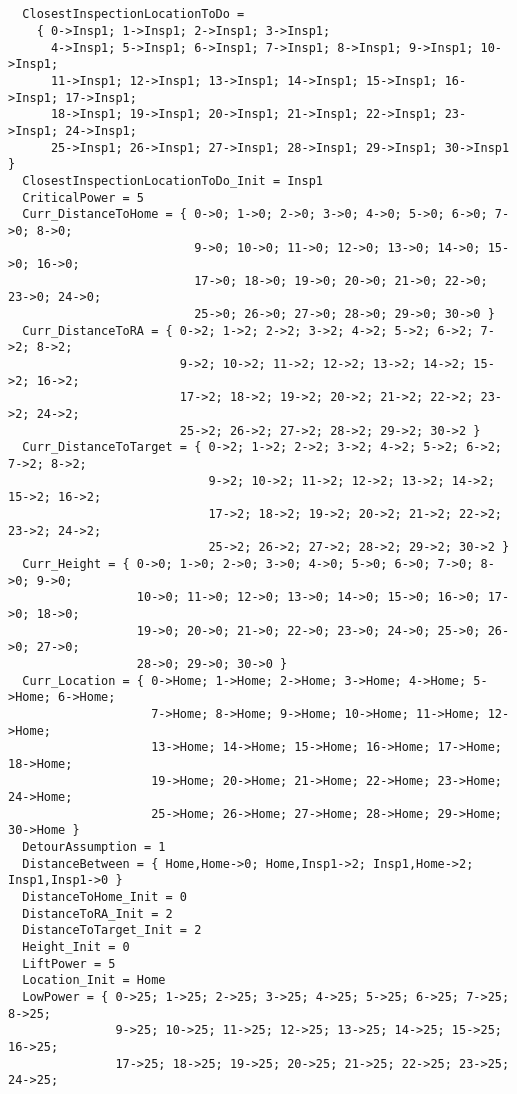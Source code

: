 \documentclass[12pt]{extarticle}
\begin{document}
\begin{lstlisting}[basicstyle=\tiny]
  
  
  ClosestInspectionLocationToDo =
    { 0->Insp1; 1->Insp1; 2->Insp1; 3->Insp1;
      4->Insp1; 5->Insp1; 6->Insp1; 7->Insp1; 8->Insp1; 9->Insp1; 10->Insp1;
      11->Insp1; 12->Insp1; 13->Insp1; 14->Insp1; 15->Insp1; 16->Insp1; 17->Insp1;
      18->Insp1; 19->Insp1; 20->Insp1; 21->Insp1; 22->Insp1; 23->Insp1; 24->Insp1;
      25->Insp1; 26->Insp1; 27->Insp1; 28->Insp1; 29->Insp1; 30->Insp1 }
  ClosestInspectionLocationToDo_Init = Insp1
  CriticalPower = 5
  Curr_DistanceToHome = { 0->0; 1->0; 2->0; 3->0; 4->0; 5->0; 6->0; 7->0; 8->0;
                          9->0; 10->0; 11->0; 12->0; 13->0; 14->0; 15->0; 16->0;
                          17->0; 18->0; 19->0; 20->0; 21->0; 22->0; 23->0; 24->0;
                          25->0; 26->0; 27->0; 28->0; 29->0; 30->0 }
  Curr_DistanceToRA = { 0->2; 1->2; 2->2; 3->2; 4->2; 5->2; 6->2; 7->2; 8->2;
                        9->2; 10->2; 11->2; 12->2; 13->2; 14->2; 15->2; 16->2;
                        17->2; 18->2; 19->2; 20->2; 21->2; 22->2; 23->2; 24->2;
                        25->2; 26->2; 27->2; 28->2; 29->2; 30->2 }
  Curr_DistanceToTarget = { 0->2; 1->2; 2->2; 3->2; 4->2; 5->2; 6->2; 7->2; 8->2;
                            9->2; 10->2; 11->2; 12->2; 13->2; 14->2; 15->2; 16->2;
                            17->2; 18->2; 19->2; 20->2; 21->2; 22->2; 23->2; 24->2;
                            25->2; 26->2; 27->2; 28->2; 29->2; 30->2 }
  Curr_Height = { 0->0; 1->0; 2->0; 3->0; 4->0; 5->0; 6->0; 7->0; 8->0; 9->0;
                  10->0; 11->0; 12->0; 13->0; 14->0; 15->0; 16->0; 17->0; 18->0;
                  19->0; 20->0; 21->0; 22->0; 23->0; 24->0; 25->0; 26->0; 27->0;
                  28->0; 29->0; 30->0 }
  Curr_Location = { 0->Home; 1->Home; 2->Home; 3->Home; 4->Home; 5->Home; 6->Home;
                    7->Home; 8->Home; 9->Home; 10->Home; 11->Home; 12->Home;
                    13->Home; 14->Home; 15->Home; 16->Home; 17->Home; 18->Home;
                    19->Home; 20->Home; 21->Home; 22->Home; 23->Home; 24->Home;
                    25->Home; 26->Home; 27->Home; 28->Home; 29->Home; 30->Home }
  DetourAssumption = 1
  DistanceBetween = { Home,Home->0; Home,Insp1->2; Insp1,Home->2; Insp1,Insp1->0 }
  DistanceToHome_Init = 0
  DistanceToRA_Init = 2
  DistanceToTarget_Init = 2
  Height_Init = 0
  LiftPower = 5
  Location_Init = Home
  LowPower = { 0->25; 1->25; 2->25; 3->25; 4->25; 5->25; 6->25; 7->25; 8->25;
               9->25; 10->25; 11->25; 12->25; 13->25; 14->25; 15->25; 16->25;
               17->25; 18->25; 19->25; 20->25; 21->25; 22->25; 23->25; 24->25;

\end{lstlisting}
\end{document}
